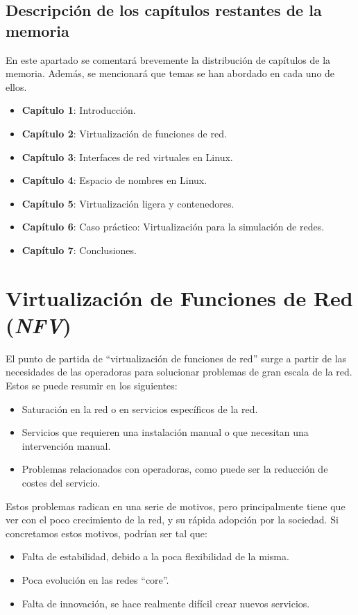 \documentclass[12pt]{article}
\begin{document}
	\subsection{Descripción de los capítulos restantes de la memoria}
	\noindent En este apartado se comentará brevemente la distribución de capítulos de la memoria. Además, se mencionará que temas se han abordado en cada uno de ellos.
	\begin{itemize}
		\item \textbf{Capítulo 1}: Introducción.
		\item \textbf{Capítulo 2}: Virtualización de funciones de red.
		\item \textbf{Capítulo 3}: Interfaces de red virtuales en Linux.
		\item \textbf{Capítulo 4}: Espacio de nombres en Linux.
		\item \textbf{Capítulo 5}: Virtualización ligera y contenedores.
		\item \textbf{Capítulo 6}: Caso práctico: Virtualización para la simulación de redes.
		\item \textbf{Capítulo 7}: Conclusiones.
	\end{itemize}
	
	
	\pagebreak
	
	\section{Virtualización de Funciones de Red (\textit{NFV})}
	\label{sec: nfv}
	\noindent El punto de partida de ``virtualización de funciones de red'' surge a partir de las necesidades de las operadoras para solucionar problemas de gran escala de la red. Estos se puede resumir en los siguientes:
	\begin{itemize}
		\item Saturación en la red o en servicios específicos de la red.
		\item Servicios que requieren una instalación manual o que necesitan una intervención manual.
		\item Problemas relacionados con operadoras, como puede ser la reducción de costes del servicio.
	\end{itemize}
	\noindent Estos problemas radican en una serie de motivos, pero principalmente tiene que ver con el poco crecimiento de la red, y su rápida adopción por la sociedad. Si concretamos estos motivos, podrían ser tal que:
	\begin{itemize}
		\item Falta de estabilidad, debido a la poca flexibilidad de la misma.
		\item Poca evolución en las redes ``core''.
		\item Falta de innovación, se hace realmente difícil crear nuevos servicios.
	\end{itemize}
\end{document}
